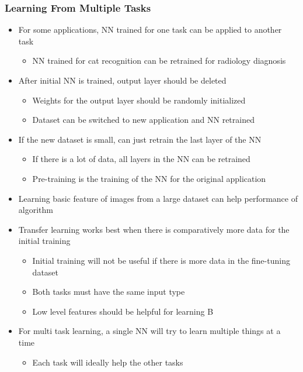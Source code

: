 \documentclass[12pt, letterpaper]{article}
\begin{document}
    \subsubsection{Learning From Multiple Tasks}
    \begin{itemize}
        \item For some applications, NN trained for one task can be applied to another task
        \begin{itemize}
            \item NN trained for cat recognition can be retrained for radiology diagnosis
        \end{itemize}
        \item After initial NN is trained, output layer should be deleted
        \begin{itemize}
            \item Weights for the output layer should be randomly initialized
            \item Dataset can be switched to new application and NN retrained
        \end{itemize}
        \item If the new dataset is small, can just retrain the last layer of the NN
        \begin{itemize}
            \item If there is a lot of data, all layers in the NN can be retrained
            \item Pre-training is the training of the NN for the original application
        \end{itemize}
        \item Learning basic feature of images from a large dataset can help performance of algorithm
        \item Transfer learning works best when there is comparatively more data for the initial training
        \begin{itemize}
            \item Initial training will not be useful if there is more data in the fine-tuning dataset
            \item Both tasks must have the same input type
            \item Low level features should be helpful for learning B
        \end{itemize}
        \item For multi task learning, a single NN will try to learn multiple things at a time
        \begin{itemize}
            \item Each task will ideally help the other tasks

\end{itemize}
\end{itemize}
\end{document}
